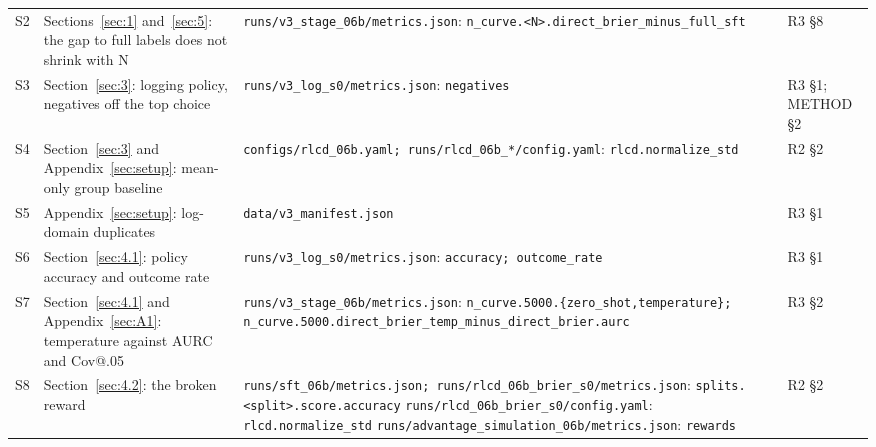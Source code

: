 \documentclass[10pt,letterpaper]{article}
\theoremstyle{plain}
\begin{document}
{\begin{longtable}{@{}p{}>{\raggedright\arraybackslash}p{}>{\raggedright\arraybackslash}p{}>{\raggedright\arraybackslash}p{}@{}}
S2 & Sections~\ref{sec:1} and~\ref{sec:5}: the gap to full labels does not shrink with N & \texttt{runs/\allowbreak{}v3\_\allowbreak{}stage\_\allowbreak{}06b/\allowbreak{}metrics.\allowbreak{}json}: \texttt{n\_\allowbreak{}curve.\allowbreak{}\textless{}N\textgreater{}.\allowbreak{}direct\_\allowbreak{}brier\_\allowbreak{}minus\_\allowbreak{}full\_\allowbreak{}sft} & R3 \S8 \\
S3 & Section~\ref{sec:3}: logging policy, negatives off the top choice & \texttt{runs/\allowbreak{}v3\_\allowbreak{}log\_\allowbreak{}s0/\allowbreak{}metrics.\allowbreak{}json}: \texttt{negatives} & R3 \S1; METHOD \S2 \\
S4 & Section~\ref{sec:3} and Appendix~\ref{sec:setup}: mean-only group baseline & \texttt{configs/\allowbreak{}rlcd\_\allowbreak{}06b.\allowbreak{}yaml;\allowbreak{} runs/\allowbreak{}rlcd\_\allowbreak{}06b\_\allowbreak{}*/\allowbreak{}config.\allowbreak{}yaml}: \texttt{rlcd.\allowbreak{}normalize\_\allowbreak{}std} & R2 \S2 \\
S5 & Appendix~\ref{sec:setup}: log-domain duplicates & \texttt{data/\allowbreak{}v3\_\allowbreak{}manifest.\allowbreak{}json} & R3 \S1 \\
S6 & Section~\ref{sec:4.1}: policy accuracy and outcome rate & \texttt{runs/\allowbreak{}v3\_\allowbreak{}log\_\allowbreak{}s0/\allowbreak{}metrics.\allowbreak{}json}: \texttt{accuracy;\allowbreak{} outcome\_\allowbreak{}rate} & R3 \S1 \\
S7 & Section~\ref{sec:4.1} and Appendix~\ref{sec:A1}: temperature against AURC and Cov@.05 & \texttt{runs/\allowbreak{}v3\_\allowbreak{}stage\_\allowbreak{}06b/\allowbreak{}metrics.\allowbreak{}json}: \texttt{n\_\allowbreak{}curve.\allowbreak{}5000.\allowbreak{}\{zero\_\allowbreak{}shot,temperature\};\allowbreak{} n\_\allowbreak{}curve.\allowbreak{}5000.\allowbreak{}direct\_\allowbreak{}brier\_\allowbreak{}temp\_\allowbreak{}minus\_\allowbreak{}direct\_\allowbreak{}brier.\allowbreak{}aurc} & R3 \S2 \\
S8 & Section~\ref{sec:4.2}: the broken reward & \texttt{runs/\allowbreak{}sft\_\allowbreak{}06b/\allowbreak{}metrics.\allowbreak{}json;\allowbreak{} runs/\allowbreak{}rlcd\_\allowbreak{}06b\_\allowbreak{}brier\_\allowbreak{}s0/\allowbreak{}metrics.\allowbreak{}json}: \texttt{splits.\allowbreak{}\textless{}split\textgreater{}.\allowbreak{}score.\allowbreak{}accuracy} \newline \texttt{runs/\allowbreak{}rlcd\_\allowbreak{}06b\_\allowbreak{}brier\_\allowbreak{}s0/\allowbreak{}config.\allowbreak{}yaml}: \texttt{rlcd.\allowbreak{}normalize\_\allowbreak{}std} \newline \texttt{runs/\allowbreak{}advantage\_\allowbreak{}simulation\_\allowbreak{}06b/\allowbreak{}metrics.\allowbreak{}json}: \texttt{rewards} & R2 \S2 \\

\end{longtable}}
\end{document}
